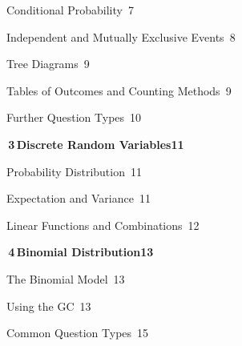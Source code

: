 {{\noindent{}\quad Conditional Probability\dotfill\ 7\par
\noindent{}\quad Independent and Mutually Exclusive Events\dotfill\ 8\par
\noindent{}\quad Tree Diagrams\dotfill\ 9\par
\noindent{}\quad Tables of Outcomes and Counting Methods\dotfill\ 9\par
\noindent{}\quad Further Question Types\dotfill\ 10\par
\vspace{0.4mm}\noindent\colorbox{blue!8}{\parbox{\dimexpr\textwidth-2\fboxsep}{\large\bfseries\color{blue!50!black}\colorbox{blue!50!black}{\color{white}\,3\,}\quad Discrete Random Variables\hfill 11}}\par\vspace{0.3mm}
\noindent{}\quad Probability Distribution\dotfill\ 11\par
\noindent{}\quad Expectation and Variance\dotfill\ 11\par
\noindent{}\quad Linear Functions and Combinations\dotfill\ 12\par
\vspace{0.4mm}\noindent\colorbox{blue!8}{\parbox{\dimexpr\textwidth-2\fboxsep}{\large\bfseries\color{blue!50!black}\colorbox{blue!50!black}{\color{white}\,4\,}\quad Binomial Distribution\hfill 13}}\par\vspace{0.3mm}
\noindent{}\quad The Binomial Model\dotfill\ 13\par
\noindent{}\quad Using the GC\dotfill\ 13\par
\noindent{}\quad Common Question Types\dotfill\ 15\par
}}
